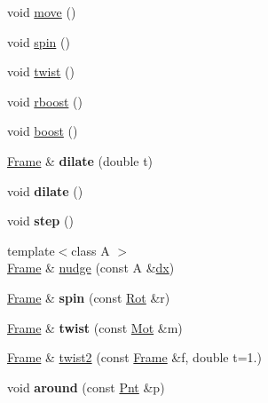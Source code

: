 \begin{DoxyCompactItemize}
\item 
void \hyperlink{classvsr_1_1_frame_a837d78a1d3e5060d55b89eeb3bb65106}{move} ()
\item 
void \hyperlink{classvsr_1_1_frame_a319a0f0f2f9acd72d3b0bfba32a3ac79}{spin} ()
\item 
void \hyperlink{classvsr_1_1_frame_ab00462a699b12e5b295f7d3d57986677}{twist} ()
\item 
void \hyperlink{classvsr_1_1_frame_a1284d85a9c3f4a80033af72f85cc3d9a}{rboost} ()
\item 
void \hyperlink{classvsr_1_1_frame_a1a48056772e909626e79d646242189e7}{boost} ()
\item 
\hypertarget{classvsr_1_1_frame_a50af97e8780b966904a395aaaac2ac06}{\hyperlink{classvsr_1_1_frame}{Frame} \& {\bfseries dilate} (double t)}\label{classvsr_1_1_frame_a50af97e8780b966904a395aaaac2ac06}

\item 
\hypertarget{classvsr_1_1_frame_a3b7b71bcc055c8e63f0bd70b42edc4bc}{void {\bfseries dilate} ()}\label{classvsr_1_1_frame_a3b7b71bcc055c8e63f0bd70b42edc4bc}

\item 
\hypertarget{classvsr_1_1_frame_a970bb134ce94c4c3adbd532acabf3416}{void {\bfseries step} ()}\label{classvsr_1_1_frame_a970bb134ce94c4c3adbd532acabf3416}

\item 
{\footnotesize template$<$class A $>$ }\\\hyperlink{classvsr_1_1_frame}{Frame} \& \hyperlink{classvsr_1_1_frame_a6c329722a835ce4de55b260a6129d599}{nudge} (const A \&\hyperlink{classvsr_1_1_frame_a556da524282d4933e3ca768ca835c352}{dx})
\item 
\hypertarget{classvsr_1_1_frame_a535a0b908d2a1142212c92f30c165c2d}{\hyperlink{classvsr_1_1_frame}{Frame} \& {\bfseries spin} (const \hyperlink{namespacevsr_aa1af5d33b552dd31499209a8f68548e8}{Rot} \&r)}\label{classvsr_1_1_frame_a535a0b908d2a1142212c92f30c165c2d}

\item 
\hypertarget{classvsr_1_1_frame_a6e9239c10d091d7ce61434750bf9a1a9}{\hyperlink{classvsr_1_1_frame}{Frame} \& {\bfseries twist} (const \hyperlink{namespacevsr_ad4b77d620ed90deefbeab9d4a122667e}{Mot} \&m)}\label{classvsr_1_1_frame_a6e9239c10d091d7ce61434750bf9a1a9}

\item 
\hyperlink{classvsr_1_1_frame}{Frame} \& \hyperlink{classvsr_1_1_frame_a497350080e727fef5d6a70848422db89}{twist2} (const \hyperlink{classvsr_1_1_frame}{Frame} \&f, double t=1.)
\item 
\hypertarget{classvsr_1_1_frame_ae667be67d425e1c8c5c1e6e876bad37e}{void {\bfseries around} (const \hyperlink{namespacevsr_a2d05beb9721c5d9211b479af6d47222d}{Pnt} \&p)}\label{classvsr_1_1_frame_ae667be67d425e1c8c5c1e6e876bad37e}


\end{DoxyCompactItemize}
